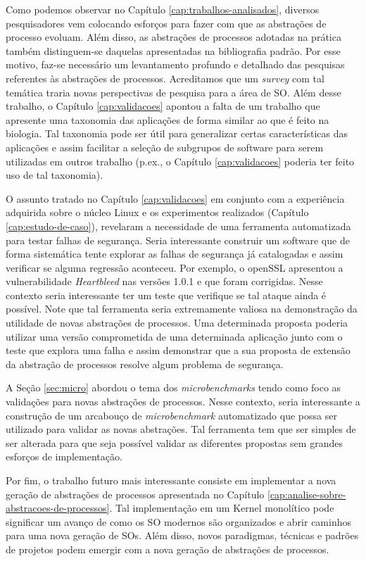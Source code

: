 Como podemos observar no Capítulo \ref{cap:trabalhos-analisados}, diversos
pesquisadores vem colocando esforços para fazer com que as abstrações de
processo evoluam. Além disso, as abstrações de processos adotadas na prática
também distinguem-se daquelas apresentadas na bibliografia padrão. Por esse
motivo, faz-se necessário um levantamento profundo e detalhado das pesquisas
referentes às abstrações de processos. Acreditamos que um
\textit{survey} com tal temática traria novas perspectivas de pesquisa para a
área de SO. Além desse trabalho, o Capítulo \ref{cap:validacoes} apontou a
falta de um trabalho que apresente uma taxonomia das aplicações de forma
similar ao que é feito na biologia.  Tal taxonomia pode ser útil para
generalizar certas características das aplicações e assim facilitar a seleção
de subgrupos de software para serem utilizadas em outros trabalho (p.ex., o
Capítulo \ref{cap:validacoes} poderia ter feito uso de tal taxonomia).

O assunto tratado no Capítulo \ref{cap:validacoes} em conjunto com a experiência adquirida sobre o
núcleo Linux e os experimentos realizados (Capítulo \ref{cap:estudo-de-caso}),
revelaram a necessidade de uma ferramenta automatizada para testar falhas de
segurança. Seria interessante construir um software que de forma sistemática
tente explorar as falhas de segurança já catalogadas e assim verificar se
alguma regressão aconteceu. Por exemplo, o openSSL apresentou a vulnerabilidade
\textit{Heartbleed} nas versões 1.0.1 e que foram corrigidas. Nesse contexto
seria interessante ter um teste que verifique se tal ataque ainda é possível.
Note que tal ferramenta seria extremamente valiosa na demonstração da utilidade
de novas abstrações de processos. Uma determinada proposta poderia utilizar uma
versão comprometida de uma determinada aplicação junto com o teste que explora
uma falha e assim demonstrar que a sua proposta de extensão da abstração de
processos resolve algum problema de segurança.

A Seção \ref{sec:micro} abordou o tema dos \textit{microbenchmarks} tendo como
foco as validações para novas abstrações de processos. Nesse contexto, seria
interessante a construção de um arcabouço de \textit{microbenchmark}
automatizado que possa ser utilizado para validar as novas abstrações. Tal
ferramenta tem que ser simples de ser alterada para que seja possível validar
as diferentes propostas sem grandes esforços de implementação.

Por fim, o trabalho futuro mais interessante consiste em implementar a nova
geração de abstrações de processos apresentada no Capítulo
\ref{cap:analise-sobre-abstracoes-de-processos}. Tal implementação
em um Kernel monolítico pode significar um avanço de como os SO modernos são
organizados e abrir caminhos para uma nova geração de SOs. Além disso, novos
paradigmas, técnicas e padrões de projetos podem emergir com a nova
geração de abstrações de processos.

